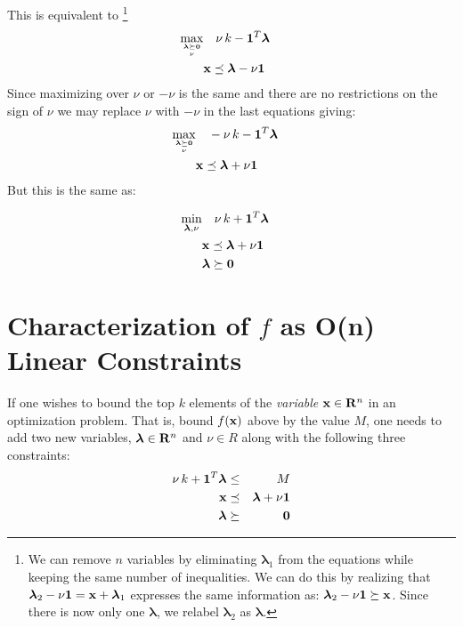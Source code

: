 \documentclass[12pt]{article}
\begin{document}
This is equivalent to%
\footnote{We can remove $n$ variables by eliminating ${\boldsymbol \lambda}_1$ from the equations while keeping
	the same number of inequalities. We can do this by realizing that ${\boldsymbol \lambda}_2 - \nu {\bf 1} = {\bf x} + {\boldsymbol \lambda}_1$ 
	expresses the same information as: ${\boldsymbol \lambda}_2 - \nu {\bf 1} \succeq {\bf x}$. Since there is now only one ${\boldsymbol \lambda}$,
we relabel ${\boldsymbol \lambda}_2$ as ${\boldsymbol \lambda}$.}
\begin{eqnarray}
	\mathop{\rm max}_{{{\boldsymbol \lambda} \succeq {\bf 0}} \atop \nu} 
		& \quad \nu \, k - {\bf 1}^T {\boldsymbol \lambda} & \\   
		& {\bf x} \preceq {\boldsymbol \lambda} - \nu {\bf 1} &
 \end{eqnarray}
Since maximizing over $\nu$ or $-\nu$ is the same and there are no restrictions on the sign of $\nu$ we may replace $\nu$ with $-\nu$ 
in the last equations giving:
\begin{eqnarray}
	\mathop{\rm max}_{{{\boldsymbol \lambda} \succeq {\bf 0}} \atop \nu} 
		& \quad -\nu \, k - {{\bf 1}^T \boldsymbol \lambda} & \\ 
	    &  {\bf x} \preceq {\boldsymbol \lambda} + \nu {\bf 1} &
 \end{eqnarray}
But this is the same as:

\begin{eqnarray}
	\mathop{\rm min}_{{\boldsymbol \lambda}, \nu} & \quad \nu \, k + {\bf 1}^T {\boldsymbol \lambda} & \\ 
												  &  {\bf x} \preceq {\boldsymbol \lambda} + \nu {\bf 1} & \\
												  & {\boldsymbol \lambda} \succeq {\bf 0} & 
 \end{eqnarray}

\section{Characterization of $f$ as O(n) Linear Constraints}
If one wishes to bound the top $k$ elements of the {\it variable\/} 
${\bf x} \in {\bf R}^n$ in an optimization problem. That is, 
bound $f({\bf x})$ above by the value $M$, 
one needs to add two new variables, ${\boldsymbol \lambda} \in {\bf R}^n$ 
and $\nu \in R$ along with the following three constraints:
\begin{eqnarray}
	\nu \, k + {\bf 1}^T {\boldsymbol \lambda}  & \le & M \label{opp1} \\ 
	{\bf x} & \preceq & {\boldsymbol \lambda} + \nu {\bf 1} \label{opp2} \\
	{\boldsymbol \lambda} & \succeq & {\bf 0}  \label{opp3}
\end{eqnarray}
\end{document}
